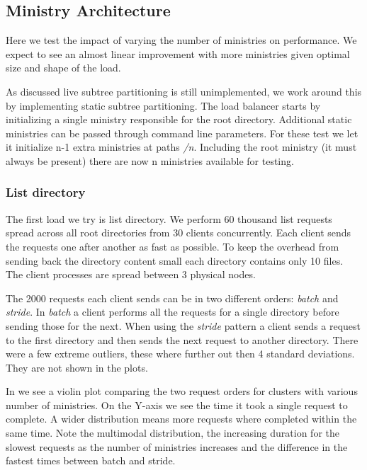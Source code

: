 \subsection{Ministry Architecture} \label{sec:res_arg}
Here we test the impact of varying the number of ministries on performance. We expect to see an almost linear improvement with more ministries given optimal size and shape of the load.

As discussed live subtree partitioning is still unimplemented, we work around this by implementing static subtree partitioning. The load balancer starts by initializing a single ministry responsible for the root directory. Additional static ministries can be passed through command line parameters. For these test we let it initialize n-1 extra ministries at paths \textsl{/n}. Including the root ministry (it must always be present) there are now n ministries available for testing.

\subsubsection*{List directory}
The first load we try is list directory. We perform 60 thousand list requests spread across all root directories from 30 clients concurrently. Each client sends the requests one after another as fast as possible. To keep the overhead from sending back the directory content small each directory contains only 10 files. The client processes are spread between 3 physical nodes.

The 2000 requests each client sends can be in two different orders: \textit{batch} and \textit{stride}. In \textit{batch} a client performs all the requests for a single directory before sending those for the next. When using the \textit{stride} pattern a client sends a request to the first directory and then sends the next request to another directory. There were a few extreme outliers, these where further out then 4 standard deviations. They are not shown in the plots. %

In  we see a violin plot comparing the two request orders for clusters with various number of ministries. On the Y-axis we see the time it took a single request to complete. A wider distribution means more requests where completed within the same time. Note the multimodal distribution, the increasing duration for the slowest requests as the number of ministries increases and the difference in the fastest times between batch and stride.

